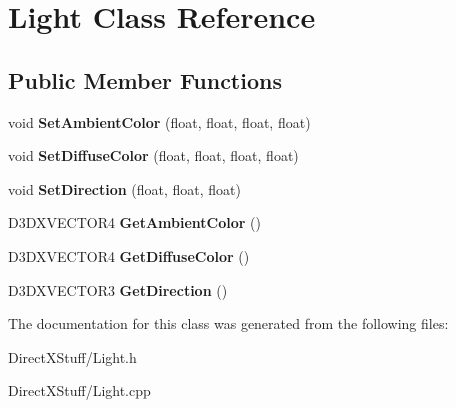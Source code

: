 \hypertarget{class_light}{\section{Light Class Reference}
\label{class_light}
}
\subsection*{Public Member Functions}
\begin{DoxyCompactItemize}
\item 
\hypertarget{class_light_a922ec9cc687298fea57b98c4fa522fb7}{void {\bfseries Set\-Ambient\-Color} (float, float, float, float)}\label{class_light_a922ec9cc687298fea57b98c4fa522fb7}

\item 
\hypertarget{class_light_ae3b890ddea4dd7aba948deda3638fb37}{void {\bfseries Set\-Diffuse\-Color} (float, float, float, float)}\label{class_light_ae3b890ddea4dd7aba948deda3638fb37}

\item 
\hypertarget{class_light_ace3427c4bf7a32f1ba563d8602864d55}{void {\bfseries Set\-Direction} (float, float, float)}\label{class_light_ace3427c4bf7a32f1ba563d8602864d55}

\item 
\hypertarget{class_light_acbd05217752613c1f915abb12d8177d1}{D3\-D\-X\-V\-E\-C\-T\-O\-R4 {\bfseries Get\-Ambient\-Color} ()}\label{class_light_acbd05217752613c1f915abb12d8177d1}

\item 
\hypertarget{class_light_a6bdfcf91f203a54e79e877a93f10c365}{D3\-D\-X\-V\-E\-C\-T\-O\-R4 {\bfseries Get\-Diffuse\-Color} ()}\label{class_light_a6bdfcf91f203a54e79e877a93f10c365}

\item 
\hypertarget{class_light_ad36cbe54b5f13d40592700756b5f90f9}{D3\-D\-X\-V\-E\-C\-T\-O\-R3 {\bfseries Get\-Direction} ()}\label{class_light_ad36cbe54b5f13d40592700756b5f90f9}

\end{DoxyCompactItemize}


The documentation for this class was generated from the following files\-:\begin{DoxyCompactItemize}
\item 
Direct\-X\-Stuff/Light.\-h\item 
Direct\-X\-Stuff/Light.\-cpp\end{DoxyCompactItemize}
